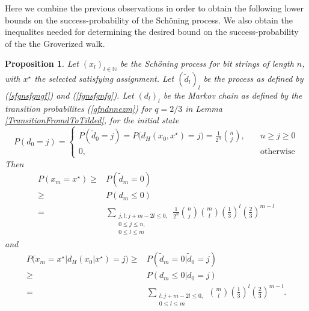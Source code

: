 \documentclass[a4paper,aps,floatfix]{revtex4}
\newtheorem{proposition}[theorem]{Proposition}
\begin{document}
Here we combine the previous observations in order to obtain the following lower bounds on the success-probability of the  Sch\"oning process. We also obtain the inequalites needed for determining the desired bound on the success-probability of the the Groverized walk.
\begin{proposition}
\label{gnsfgnsgm}
Let $(x_l)_{l\in\mathbb{N}}$ be the Sch\"oning process for bit strings of length $n$, with $x^{\star}$ the selected satisfying assignment. Let $(\tilde{d}_l)_{l}$ be the process as defined by (\ref{sfgnsfgngf}) and (\ref{fgnsfgnfg}).
Let $(d_l)_l$ be the Markov chain as defined by the transition probabilites (\ref{gfndnnezm}) for $q = 2/3$  in Lemma \ref{TransitionFromdToTilded}, for the initial state
\begin{equation}
\label{savnosdvn2}
P(d_0 = j) = \left\{\begin{matrix}
P(\tilde{d}_0 = j) =  P\big(d_H(x_0,x^{\star}) =j\big) = \frac{1}{2^n}\binom{n}{j}, & \quad n\geq j \geq 0\\
0 , & \quad  \mathrm{otherwise}
\end{matrix}\right.
\end{equation}
 Then
\begin{equation}
\label{ybfdfnggf}
\begin{split}
P(x_m = x^{\star}) \geq  &  P(\tilde{d}_m= 0) \\
 \geq &  P(d_m\leq 0)\\
 = &   \sum_{\substack{j,l: j+ m-2l \leq 0,\\ 0 \leq j\leq n,\\ 0\leq l\leq m}}  \frac{1}{2^n}\binom{n}{j} \binom{m}{l}  \left(\frac{1}{3}\right)^{l}\left(\frac{2}{3}\right)^{m-l}
\end{split}
\end{equation}
and
\begin{equation}
\label{dvafebrtnrtnw}
\begin{split}
P\big(x_m = x^{\star}\big|d_H(x_0|x^{\star}) = j\big) \geq  & P(\tilde{d}_m =  0|\tilde{d}_0 = j) \\
 \geq & P(d_m\leq 0|d_0 = j)\\
 = & \sum_{\substack{l: j+ m-2l \leq 0,\\ 0\leq l\leq m}}    \binom{m}{l}  \left(\frac{1}{3}\right)^{l}\left(\frac{2}{3}\right)^{m-l}.
\end{split}
\end{equation}
\end{proposition}
\end{document}

